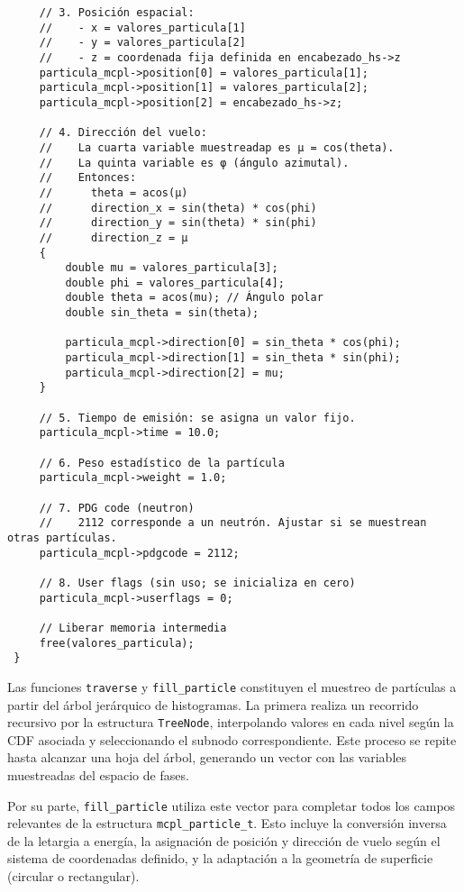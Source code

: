\begin{verbatim}
     // 3. Posición espacial:
     //    - x = valores_particula[1]
     //    - y = valores_particula[2]
     //    - z = coordenada fija definida en encabezado_hs->z
     particula_mcpl->position[0] = valores_particula[1];
     particula_mcpl->position[1] = valores_particula[2];
     particula_mcpl->position[2] = encabezado_hs->z;
 
     // 4. Dirección del vuelo:
     //    La cuarta variable muestreadap es μ = cos(theta).
     //    La quinta variable es φ (ángulo azimutal).
     //    Entonces:
     //      theta = acos(μ)
     //      direction_x = sin(theta) * cos(phi)
     //      direction_y = sin(theta) * sin(phi)
     //      direction_z = μ
     {
         double mu = valores_particula[3];
         double phi = valores_particula[4];
         double theta = acos(mu); // Ángulo polar
         double sin_theta = sin(theta);
 
         particula_mcpl->direction[0] = sin_theta * cos(phi);
         particula_mcpl->direction[1] = sin_theta * sin(phi);
         particula_mcpl->direction[2] = mu;
     }
 
     // 5. Tiempo de emisión: se asigna un valor fijo.
     particula_mcpl->time = 10.0;
 
     // 6. Peso estadístico de la partícula
     particula_mcpl->weight = 1.0;
 
     // 7. PDG code (neutron)
     //    2112 corresponde a un neutrón. Ajustar si se muestrean otras partículas.
     particula_mcpl->pdgcode = 2112;
 
     // 8. User flags (sin uso; se inicializa en cero)
     particula_mcpl->userflags = 0;
 
     // Liberar memoria intermedia
     free(valores_particula);
 }
\end{verbatim}

\noindent
Las funciones \texttt{traverse} y \texttt{fill\_particle} constituyen el muestreo de partículas a partir del árbol jerárquico de histogramas. La primera realiza un recorrido recursivo por la estructura \texttt{TreeNode}, interpolando valores en cada nivel según la CDF asociada y seleccionando el subnodo correspondiente. Este proceso se repite hasta alcanzar una hoja del árbol, generando un vector con las variables muestreadas del espacio de fases.

Por su parte, \texttt{fill\_particle} utiliza este vector para completar todos los campos relevantes de la estructura \texttt{mcpl\_particle\_t}. Esto incluye la conversión inversa de la letargia a energía, la asignación de posición y dirección de vuelo según el sistema de coordenadas definido, y la adaptación a la geometría de superficie (circular o rectangular).


